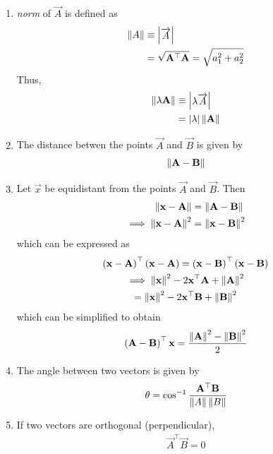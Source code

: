 \documentclass[journal,12pt,twocolumn]{IEEEtran}
\renewcommand\thesection{\arabic{section}}
\renewcommand\thesubsection{\thesection.\arabic{subsection}}
\begin{document}
\begin{enumerate}[label=\thesubsection.\arabic*.,ref=\thesubsection.\theenumi]
%
\item {\em norm} of $\vec{A}$ is defined as
\begin{align}
  \label{eq:norm2d}
  \left\lVert A\right\rVert &\equiv \begin{vmatrix}\overrightarrow{A}\end{vmatrix}
  \\
  &= \sqrt{\mathbf{A}^{\top} \mathbf{A}}= \sqrt{a_1^2+a_2^2}
\end{align}
Thus, 
\begin{align}
  \label{eq:norm2d_const}
  \left\lVert\lambda \mathbf{A}\right\rVert &\equiv \begin{vmatrix}\lambda\overrightarrow{A}\end{vmatrix}
  \\
  &= \left\vert\lambda\right\vert \left\lVert\mathbf{A}\right\rVert
\end{align}
\item The distance betwen the points $\vec{A}$ and $\vec{B}$ is given by 
\begin{align}
  \label{eq:norm2d_dist}
\left\lVert\mathbf{A}-\mathbf{B}\right\rVert 
\end{align}
\item Let $\vec{x}$ be equidistant from the points $\vec{A}$ and $\vec{B}$.  Then 
\begin{align}
	\left\lVert\mathbf{x}-\mathbf{A}\right\rVert &=
\left\lVert\mathbf{A}-\mathbf{B}\right\rVert 
\\
	\implies \left\lVert\mathbf{x}-\mathbf{A}\right\rVert^2 &=
\left\lVert\mathbf{x}-\mathbf{B}\right\rVert^2 
\end{align}
which can be expressed as 
\begin{multline}
	\left(\mathbf{x}-\mathbf{A}\right)^{\top} \left(\mathbf{x}-\mathbf{A}\right)=
	\left(\mathbf{x}-\mathbf{B}\right)^{\top} 
\left(\mathbf{x}-\mathbf{B}\right)
\\
	\implies	\left\lVert\mathbf{x}\right\rVert^2-2{\mathbf{x}}^{\top}\mathbf{A} + \left\lVert\mathbf{A}\right\rVert^2
	\\= \left\lVert\mathbf{x}\right\rVert^2-2{\mathbf{x}}^{\top}\mathbf{B} + \left\lVert\mathbf{B}\right\rVert^2
\end{multline}
which can be simplified to obtain
  \begin{align}
	  \left(\mathbf{A}-\mathbf{B}\right)^{\top}{\mathbf{x}} 
	  =  \frac{\left\lVert\mathbf{A}\right\rVert^2 - \left\lVert\mathbf{B}\right\rVert^2}{2}
  \label{eq:norm2d_equidist}
  \end{align}
  \item The angle between two vectors is given by 
  \begin{align}
    \label{eq:angle2d}
    \theta = \cos^{-1}\frac{\mathbf{A}^{\top} \mathbf{B}}{\left\lVert A\right\rVert\left\lVert B\right\rVert}
  \end{align}
  \item If two vectors are orthogonal (perpendicular), 
  \begin{align}
    \label{eq:angle2d_orth}
\vec{A}^{\top} \vec{B} = 0
  \end{align}


\end{enumerate}
\end{document}
